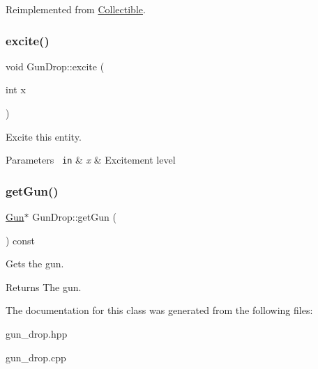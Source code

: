 Reimplemented from \mbox{\hyperlink{class_collectible_a4bd92e0f368cd712b86e3ebabc3599f1}{Collectible}}.

\mbox{\label{class_gun_drop_adcea99c3d6a6e8e686b8f6e9f091ed81}} 
\subsubsection{\texorpdfstring{excite()}{excite()}}
{\footnotesize\ttfamily void Gun\+Drop\+::excite (\begin{DoxyParamCaption}\item[{int}]{x }\end{DoxyParamCaption})\hspace{0.3cm}{\ttfamily [inline]}}



Excite this entity. 


\begin{DoxyParams}[1]{Parameters}
\mbox{\texttt{ in}}  & {\em x} & Excitement level \\
\hline
\end{DoxyParams}
\mbox{\label{class_gun_drop_ad932a5b1f5ec6e96a802898d1a5bf55e}} 
\subsubsection{\texorpdfstring{getGun()}{getGun()}}
{\footnotesize\ttfamily \mbox{\hyperlink{class_gun}{Gun}}$\ast$ Gun\+Drop\+::get\+Gun (\begin{DoxyParamCaption}{ }\end{DoxyParamCaption}) const\hspace{0.3cm}{\ttfamily [inline]}}



Gets the gun. 

\begin{DoxyReturn}{Returns}
The gun. 
\end{DoxyReturn}


The documentation for this class was generated from the following files\+:\begin{DoxyCompactItemize}
\item 
gun\+\_\+drop.\+hpp\item 
gun\+\_\+drop.\+cpp\end{DoxyCompactItemize}
